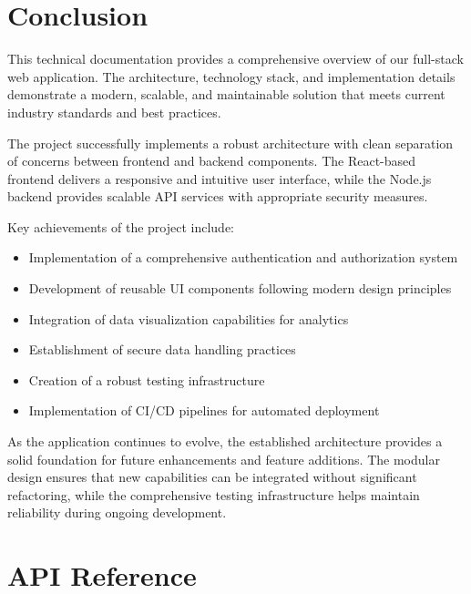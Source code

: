 \documentclass[12pt,a4paper]{article}
\begin{document}
\section{Conclusion}
This technical documentation provides a comprehensive overview of our full-stack web application. The architecture, technology stack, and implementation details demonstrate a modern, scalable, and maintainable solution that meets current industry standards and best practices.

The project successfully implements a robust architecture with clean separation of concerns between frontend and backend components. The React-based frontend delivers a responsive and intuitive user interface, while the Node.js backend provides scalable API services with appropriate security measures.

Key achievements of the project include:

\begin{itemize}
    \item Implementation of a comprehensive authentication and authorization system
    \item Development of reusable UI components following modern design principles
    \item Integration of data visualization capabilities for analytics
    \item Establishment of secure data handling practices
    \item Creation of a robust testing infrastructure
    \item Implementation of CI/CD pipelines for automated deployment
\end{itemize}

As the application continues to evolve, the established architecture provides a solid foundation for future enhancements and feature additions. The modular design ensures that new capabilities can be integrated without significant refactoring, while the comprehensive testing infrastructure helps maintain reliability during ongoing development.

\appendix
\section{API Reference}\label{appendix:api}
\end{document}
